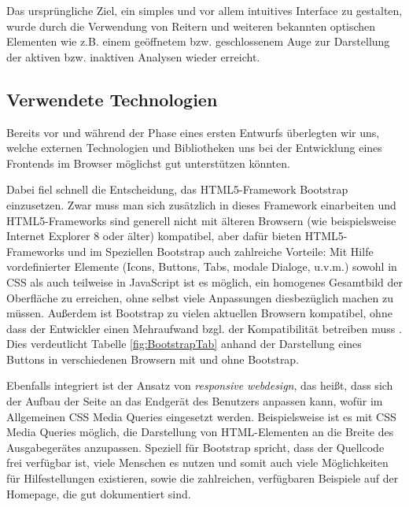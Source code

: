 Das ursprüngliche Ziel, ein simples und vor allem intuitives Interface zu gestalten, wurde durch die Verwendung von Reitern und weiteren bekannten optischen Elementen wie z.B. einem geöffnetem bzw. geschlossenem Auge zur Darstellung der aktiven bzw. inaktiven Analysen wieder erreicht.

\subsection{Verwendete Technologien}
Bereits vor und während der Phase eines ersten Entwurfs überlegten wir uns, welche externen Technologien und Bibliotheken uns bei der Entwicklung eines Frontends im Browser möglichst gut unterstützen könnten.

Dabei fiel schnell die Entscheidung, das HTML5-Framework Bootstrap \cite{Bootstrap} einzusetzen. Zwar muss man sich zusätzlich in dieses Framework einarbeiten und HTML5-Frameworks sind generell nicht mit älteren Browsern (wie beispielsweise Internet Explorer 8 oder älter) kompatibel, aber dafür bieten HTML5-Frameworks und im Speziellen Bootstrap auch zahlreiche Vorteile: Mit Hilfe vordefinierter Elemente (Icons, Buttons, Tabs, modale Dialoge, u.v.m.) sowohl in CSS als auch teilweise in JavaScript ist es möglich, ein homogenes Gesamtbild der Oberfläche zu erreichen, ohne selbst viele Anpassungen diesbezüglich machen zu müssen. Außerdem ist Bootstrap zu vielen aktuellen Browsern kompatibel, ohne dass der Entwickler einen Mehraufwand bzgl. der Kompatibilität betreiben muss \cite{BootstrapCompatibility}. Dies verdeutlicht Tabelle \ref{fig:BootstrapTab} anhand der Darstellung eines Buttons in verschiedenen Browsern mit und ohne Bootstrap.

Ebenfalls integriert ist der Ansatz von \textit{responsive webdesign}, das heißt, dass sich der Aufbau der Seite an das Endgerät des Benutzers anpassen kann, wofür im Allgemeinen CSS Media Queries \cite{CSSMediaQueries} eingesetzt werden. Beispielsweise ist es mit CSS Media Queries möglich, die Darstellung von HTML-Elementen an die Breite des Ausgabegerätes anzupassen. Speziell für Bootstrap spricht, dass der Quellcode frei verfügbar ist, viele Menschen es nutzen und somit auch viele Möglichkeiten für Hilfestellungen existieren, sowie die zahlreichen, verfügbaren Beispiele auf der Homepage, die gut dokumentiert sind.

